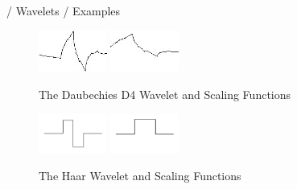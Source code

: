 \documentclass{beamer}
\def\RImageSize{0.2\textwidth}
\def\RImageSpace{\hspace{1cm}}
\begin{document}
\begin{frame}{/ Wavelets / Examples}

  \begin{figure}[hbt]
    \begin{center}
      \includegraphics[width=\RImageSize]{daubechies-d4-wavelet.jpg}
      \RImageSpace
      \includegraphics[width=\RImageSize]{daubechies-d4-scaling.jpg}
      \caption{The Daubechies D4 Wavelet and Scaling Functions}
    \end{center}
  \end{figure}

  \pause
  \begin{figure}[hbt]
    \begin{center}
      \includegraphics[width=\RImageSize]{haar-wavelet.jpg}
      \RImageSpace
      \includegraphics[width=\RImageSize]{haar-scaling.jpg}
      \caption{The Haar Wavelet and Scaling Functions}
    \end{center}
  \end{figure}

\end{frame}
\end{document}
